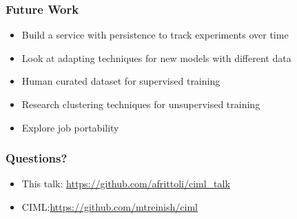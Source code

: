 \documentclass[aspectratio=169,11pt,hyperref={colorlinks=true}]{beamer}
\begin{document}
\begin{frame}
  \frametitle{Future Work}
  \begin{itemize}
      \item{Build a service with persistence to track experiments over time}
      \item{Look at adapting techniques for new models with different data}
      \item{Human curated dataset for supervised training}
      \item{Research clustering techniques for unsupervised training}
      \item{Explore job portability}
  \end{itemize}
\end{frame}

\begin{frame}
  \frametitle{Questions?}
  \begin{itemize}
      \item{This talk: \href{https://github.com/afrittoli/ciml\_talk}{https://github.com/afrittoli/ciml\_talk}}
      \item{CIML:\href{https://github.com/mtreinish/ciml}{https://github.com/mtreinish/ciml}}
  \end{itemize}
\end{frame}
\end{document}
